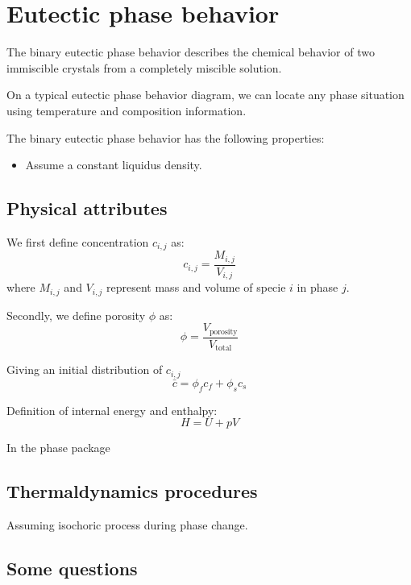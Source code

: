 \section{Eutectic phase behavior}
The binary eutectic phase behavior describes the chemical behavior of 
two immiscible crystals from a completely miscible solution.

On a typical eutectic phase behavior diagram, we can locate any phase situation
using temperature and composition information.

The binary eutectic phase behavior has the following properties:
\begin{itemize}
		  \item Assume a constant liquidus density. 
\end{itemize}

\subsection{Physical attributes}
We first define concentration $c_{i,j}$ as:
\begin{equation*}
		  c_{i,j} = \frac{M_{i,j}}{V_{i,j}}
\end{equation*}
where $M_{i,j}$ and $V_{i,j}$ represent mass and volume of specie $i$ in phase $j$.

Secondly, we define porosity $\phi$ as:
\begin{equation*}
		  \phi = \frac{V_{\text{porosity}}}{V_{\text{total}}}
\end{equation*}


Giving an initial distribution of $c_{i,j}$
\begin{equation*}
		  \bar{c} = \phi_f c_f + \phi_s c_s
\end{equation*}

Definition of internal energy and enthalpy:
\begin{equation*}
H = U + pV
\end{equation*}

In the phase package 

\subsection{Thermaldynamics procedures}
Assuming isochoric process during phase change.


\subsection{Some questions}


